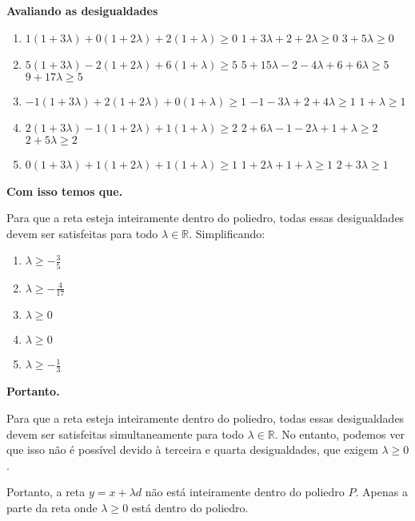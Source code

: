 \documentclass{article}
\begin{document}
\textbf{Avaliando as desigualdades}

\begin{enumerate}
\item $1(1 + 3\lambda) + 0(1 + 2\lambda) + 2(1 + \lambda) \geq 0$
   $1 + 3\lambda + 2 + 2\lambda \geq 0$
   $3 + 5\lambda \geq 0$

\item $5(1 + 3\lambda) - 2(1 + 2\lambda) + 6(1 + \lambda) \geq 5$
   $5 + 15\lambda - 2 - 4\lambda + 6 + 6\lambda \geq 5$
   $9 + 17\lambda \geq 5$

\item $-1(1 + 3\lambda) + 2(1 + 2\lambda) + 0(1 + \lambda) \geq 1$
   $-1 - 3\lambda + 2 + 4\lambda \geq 1$
   $1 + \lambda \geq 1$

\item $2(1 + 3\lambda) - 1(1 + 2\lambda) + 1(1 + \lambda) \geq 2$
   $2 + 6\lambda - 1 - 2\lambda + 1 + \lambda \geq 2$
   $2 + 5\lambda \geq 2$

\item $0(1 + 3\lambda) + 1(1 + 2\lambda) + 1(1 + \lambda) \geq 1$
   $1 + 2\lambda + 1 + \lambda \geq 1$
   $2 + 3\lambda \geq 1$
\end{enumerate}

\textbf{Com isso temos que.}

Para que a reta esteja inteiramente dentro do poliedro, todas essas desigualdades devem ser satisfeitas para todo $\lambda \in \mathbb{R}$. Simplificando:

\begin{enumerate}
\item $\lambda \geq -\frac{3}{5}$
\item $\lambda \geq -\frac{4}{17}$
\item $\lambda \geq 0$
\item $\lambda \geq 0$
\item $\lambda \geq -\frac{1}{3}$
\end{enumerate}

\textbf{Portanto.}

Para que a reta esteja inteiramente dentro do poliedro, todas essas desigualdades devem ser satisfeitas simultaneamente para todo $\lambda \in \mathbb{R}$. No entanto, podemos ver que isso não é possível devido à terceira e quarta desigualdades, que exigem $\lambda \geq 0$.

Portanto, a reta $y = x + \lambda d$ não está inteiramente dentro do poliedro $P$. Apenas a parte da reta onde $\lambda \geq 0$ está dentro do poliedro.
\end{document}
